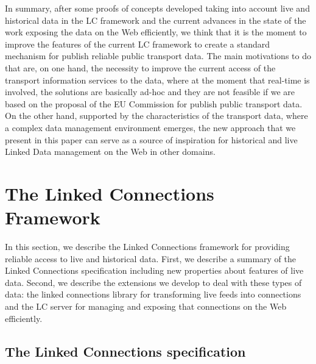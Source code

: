 \documentclass[sw]{iosart2x}
\begin{document}
In summary, after some proofs of concepts developed taking into account live and historical data in the LC framework and the current advances in the state of the work exposing the data on the Web efficiently, we think that it is the moment to improve the features of the current LC framework to create a standard mechanism for publish reliable public transport data. The main motivations to do that are, on one hand, the necessity to improve the current access of the transport information services to the data, where at the moment that real-time is involved, the solutions are basically ad-hoc and they are not feasible if we are based on the proposal of the EU Commission for publish public transport data. On the other hand, supported by the characteristics of the transport data, where a complex data management environment emerges, the new approach that we present in this paper can serve as a source of inspiration for historical and live Linked Data management on the Web in other domains.



\section{The Linked Connections Framework}
In this section, we describe the Linked Connections framework for providing reliable access to live and historical data. First, we describe a summary of the Linked Connections specification including new properties about features of live data. Second, we describe the extensions we develop to deal with these types of data: the linked connections library for transforming live feeds into connections and the LC server for managing and exposing that connections on the Web efficiently.

\subsection{The Linked Connections specification}
\end{document}
